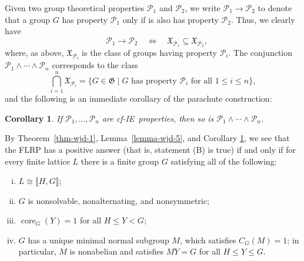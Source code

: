 \documentclass{gen-j-l}
\newcommand{\lb}{\ensuremath{\llbracket}}
\newcommand{\rb}{\ensuremath{\rrbracket}}
\newcommand{\<}{\ensuremath{\langle}}
\renewcommand{\>}{\ensuremath{\rangle}}
\theoremstyle{plain}
\newtheorem{corollary}[theorem]{Corollary}
\theoremstyle{definition}
\theoremstyle{remark}
\numberwithin{theorem}{section}
\numberwithin{claim}{section}
\numberwithin{equation}{section}
\numberwithin{conjecture}{section}
\renewcommand{\leq}{\ensuremath{\leqslant}}
\newcommand{\meet}{\ensuremath{\wedge}}
\newcommand{\core}{\ensuremath{\operatorname{core}}}
\newcommand{\2}{\ensuremath{\mathbf{2}}}
\newcommand{\3}{\ensuremath{\mathbf{3}}}
\newcommand{\sG}{\ensuremath{\mathfrak{X}}}
\newcommand{\G}{\ensuremath{\mathfrak{G}}}
\newcommand{\cP}{\ensuremath{\mathcal{P}}}
\newcommand{\IE}{{\small IE}}
\begin{document}
Given two group theoretical properties $\cP_1$ and $\cP_2$, we write
$\cP_1 \longrightarrow \cP_2$ to denote that a group $G$ has property $\cP_1$ only
if is also has property $\cP_2$. 
Thus, we clearly have 
\[
\quad \cP_1 \longrightarrow \cP_2 \quad
\Longleftrightarrow \quad \sG_{\cP_1}\subseteq
\sG_{\cP_2},
\]
where, as above, $\sG_{\cP_i}$ is the class of groups 
having property $\cP_i$. The conjunction $\cP_1 \meet \cdots \meet \cP_n$ corresponds to the class 
\[
\bigcap_{i=1}^n \sG_{\cP_i} = \{G \in \G \mid G \text{ has property $\cP_i$ for
  all $1\leq i\leq n$} \},
\]
and the following is an immediate corollary of the parachute construction:
\begin{corollary}
\label{cor:isle-prop-groups-1}
  If $\cP_1, \dots, \cP_n$ are cf-\IE\ properties,
  then so is $\cP_1 \meet \cdots \meet \cP_n$.
\end{corollary}

By Theorem~\ref{thm-wjd-1}, Lemma~\ref{lemma-wjd-5}, and
Corollary \ref{cor:isle-prop-groups-1}, we see that the \acs{FLRP} has a
positive answer (that is, statement (B) is true) if and only if for every finite
lattice $L$ there is a finite group $G$ satisfying all of the following:
\begin{enumerate}[(i)]
\item $L\cong \lb H, G \rb$;
\item $G$ is nonsolvable, nonalternating, and nonsymmetric;
\item $\core_G(Y) = 1$ for all $H\leq Y < G$;
\item $G$ has a unique minimal normal subgroup $M$, which satisfies $C_G(M) =
  1$;
in particular, $M$ is nonabelian and satisfies $MY = G$ for all $H\leq Y \leq G$.

\end{enumerate}

 
% 
%

\end{document}
